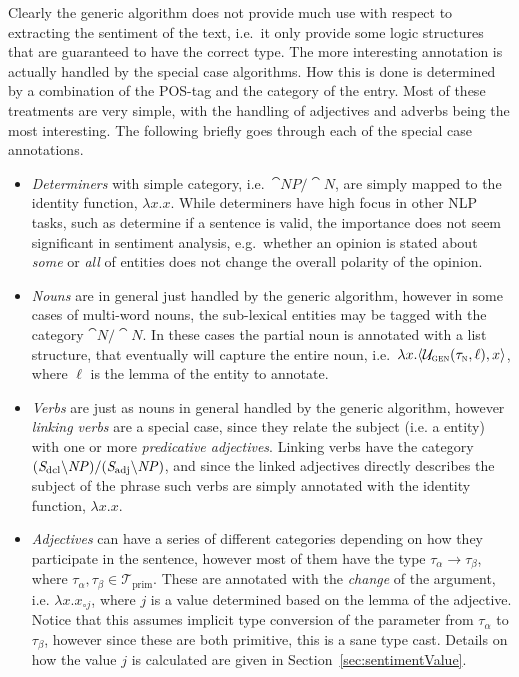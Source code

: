 Clearly the generic algorithm does not provide much use with respect to extracting the sentiment of the text, i.e.\ it only provide some logic structures that are guaranteed to have the correct type. The more interesting annotation is actually handled by the special case algorithms. How this is done is determined by a combination of the POS-tag and the category of the entry. Most of these treatments are very simple, with the handling of adjectives and adverbs being the most interesting. The following briefly goes through each of the special case annotations.

\begin{itemize}
	\item \emph{Determiners} with simple category, i.e.\ $\cat{NP}/\cat{N}$, are simply mapped to the identity function, $\lambda x.x$.
	While determiners have high focus in other NLP tasks, such as determine if a sentence is valid, the importance does not seem significant in sentiment analysis, e.g.\ whether an opinion is stated about \emph{some} or \emph{all} of entities does not change the overall polarity of the opinion.

	\item \emph{Nouns} are in general just handled by the generic algorithm, however in some cases of multi-word nouns, the sub-lexical entities may be tagged with the category $\cat{N}/\cat{N}$. In these cases the partial noun is annotated with a list structure, that eventually will capture the entire noun, i.e.\ $\lambda x.\langle \mathcal{U}_\textsc{gen}(\tau_\textsc{n}, \ell), x\rangle$, where $\ell$ is the lemma of the entity to annotate.

	\item \emph{Verbs} are just as nouns in general handled by the generic algorithm, however \emph{linking verbs} are a special case, since they relate the subject (i.e. a entity) with one or more \emph{predicative adjectives}. Linking verbs have the category $({\mathit{S}}_\mathrm{dcl} \backslash {\mathit{NP}})/({\mathit{S}}_\mathrm{adj} \backslash {\mathit{NP}})$, and since the linked adjectives directly describes the subject of the phrase such verbs are simply annotated with the identity function, $\lambda x.x$. 

	\item \emph{Adjectives} can have a series of different categories depending on how they participate in the sentence, however most of them have the type $\tau_\alpha \to \tau_\beta$, where $\tau_\alpha, \tau_\beta \in \mathcal{T}_\mathrm{prim}$. These are annotated with the \emph{change} of the argument, i.e. $\lambda x.x_{\circ j}$, where $j$ is a value determined based on the lemma of the adjective. Notice that this assumes implicit type conversion of the parameter from $\tau_\alpha$ to $\tau_\beta$, however since these are both primitive, this is a sane type cast. Details on how the value $j$ is calculated are given in Section~\ref{sec:sentimentValue}.


\end{itemize}

